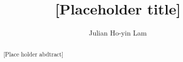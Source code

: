 \documentclass[]{report}
\title{[Placeholder title]}
\author{Julian Ho-yin Lam}
\begin{document}

\setcounter{page}{0}

\begin{abstract}
[Place holder abdtract]
\end{abstract}
\tableofcontents
\listoffigures
\listoftables
\setcounter{page}{0}











\end{document}
